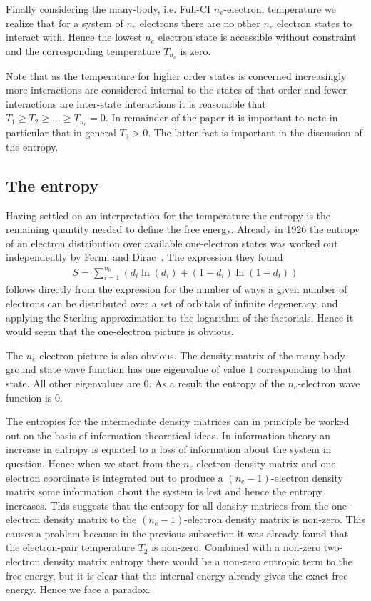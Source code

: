 \documentclass[pra]{revtex4-1}
\begin{document}
Finally considering the many-body, i.e. Full-CI $n_e$-electron, temperature
we realize that for a system of $n_e$ electrons there are no other $n_e$
electron states to interact with. Hence the lowest $n_e$ electron state is
accessible without constraint and the corresponding temperature $T_{n_e}$ is
zero.

Note that as the temperature for higher order states is concerned increasingly
more interactions are considered internal to the states of that order and
fewer interactions are inter-state interactions it is
reasonable that $T_1 \ge T_2 \ge \ldots \ge T_{n_e} = 0$. In remainder of the
paper it is important to note in particular that in general $T_2 > 0$. The 
latter fact is important in the discussion of the entropy.

\subsection{The entropy}

Having settled on an interpretation for the temperature the entropy is the
remaining quantity needed to define the free energy. Already in 1926 the
entropy of an electron distribution over available one-electron states was
worked out independently by Fermi and Dirac~\cite{Fermi_1926,Dirac_1926}.
The expression they found
\begin{eqnarray}
   S = \sum_{i=1}^{n_b} \left(d_i\ln(d_i) + (1-d_i)\ln(1-d_i)\right)
   \label{Eq:Entropy}
\end{eqnarray}
follows directly from the expression for the number of ways a given number
of electrons can be distributed over a set of orbitals of infinite degeneracy, 
and applying the Sterling approximation to the logarithm of the factorials.
Hence it would seem that the one-electron picture is obvious.

The $n_e$-electron picture is also obvious. The density matrix of the many-body
ground state wave function has one eigenvalue of value $1$ corresponding to that
state. All other eigenvalues are $0$. As a result the entropy of the 
$n_e$-electron wave function is $0$. 

The entropies for the intermediate density matrices can in principle be worked
out on the basis of information theoretical ideas. In information theory an 
increase in entropy is equated to a loss of information about the system in 
question. Hence when we start from the $n_e$ electron density matrix and one
electron coordinate is integrated out to produce a $(n_e-1)$-electron density
matrix some information about the system is lost and hence the entropy 
increases. This suggests that the entropy for all density matrices from the
one-electron density matrix to the $(n_e-1)$-electron density matrix is
non-zero.
This causes a problem because in the previous subsection it was already found
that the electron-pair temperature $T_2$ is non-zero. Combined with a non-zero
two-electron density matrix entropy there would be a non-zero entropic term to
the free energy, but it is clear that the internal energy already gives the
exact free energy. Hence we face a paradox.
\end{document}
